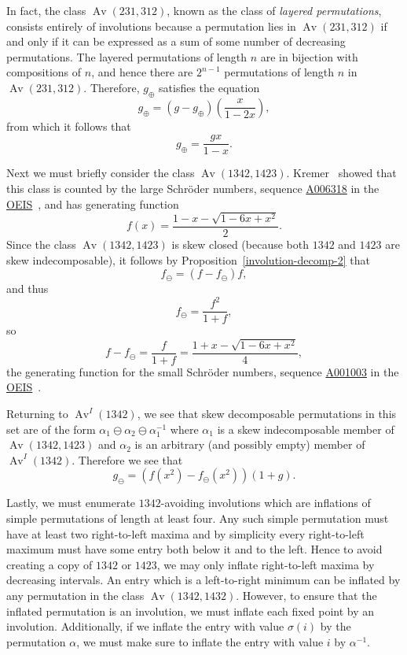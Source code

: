 \documentclass[10pt]{article}
\theoremstyle{plain}
\newcommand{\Av}{\operatorname{Av}}
\newcommand{\ds}{\displaystyle}
\newcommand{\pa}[1]{\left({#1}\right)}
\newcommand{\f}[2]{\ds\frac{{#1}}{{#2}}}
\newcommand{\OEISlink}[1]{\href{http://oeis.org/#1}{#1}}
\newcommand{\OEISref}{\href{http://oeis.org/}{OEIS}~\cite{sloane:the-on-line-enc:}}
\newcommand{\OEIS}[1]{sequence \OEISlink{#1} in the \OEISref}
\begin{document}
In fact, the class $\Av(231,312)$, known as the class of \emph{layered permutations}, consists entirely of involutions because a permutation lies in $\Av(231,312)$ if and only if it can be expressed as a sum of some number of decreasing permutations. The layered permutations of length $n$ are in bijection with compositions of $n$, and hence there are $2^{n-1}$ permutations of length $n$ in $\Av(231,312)$. Therefore, $g_\oplus$ satisfies the equation
	\[g_\oplus = \pa{g - g_\oplus}\pa{\f{x}{1-2x}},\]
from which it follows that
	\begin{equation}
	\label{eq-1342-1}
	g_\oplus = \f{gx}{1-x}.
	\end{equation}

Next we must briefly consider the class $\Av(1342,1423)$. Kremer~\cite{kremer:permutations-wi:, kremer:postscript:-per:} showed that this class is counted by the large Schr\"oder numbers, \OEIS{A006318}, and has generating function
	\[f(x) = \f{1-x-\sqrt{1-6x+x^2}}{2}.\]
Since the class $\Av(1342,1423)$ is skew closed (because both $1342$ and $1423$ are skew indecomposable), it follows by Proposition~\ref{involution-decomp-2} that
	\[f_\ominus = (f - f_\ominus)f,\]
and thus
	\[f_\ominus = \f{f^2}{1+f},\]
so
	\[f - f_\ominus = \f{f}{1+f} = \f{1+x-\sqrt{1-6x+x^2}}{4},\]
the generating function for the small Schr\"oder numbers, \OEIS{A001003}.

Returning to $\Av^I(1342)$, we see that skew decomposable permutations in this set are of the form $\alpha_1\ominus\alpha_2\ominus\alpha_1^{-1}$ where $\alpha_1$ is a skew indecomposable member of $\Av(1342,1423)$ and $\alpha_2$ is an arbitrary (and possibly empty) member of $\Av^I(1342)$. Therefore we see that
	\begin{equation}
	\label{eq-1342-2}
	g_\ominus = \pa{f(x^2)-f_\ominus(x^2)}(1+g).
	\end{equation}
	
Lastly, we must enumerate $1342$-avoiding involutions which are inflations of simple permutations of length at least four. Any such simple permutation must have at least two right-to-left maxima and by simplicity every right-to-left maximum must have some entry both below it and to the left. Hence to avoid creating a copy of $1342$ or $1423$, we may only inflate right-to-left maxima by decreasing intervals. An entry which is a left-to-right minimum can be inflated by any permutation in the class $\Av(1342,1432)$. However, to ensure that the inflated permutation is an involution, we must inflate each fixed point by an involution. Additionally, if we inflate the entry with value $\sigma(i)$ by the permutation $\alpha$, we must make sure to inflate the entry with value $i$ by $\alpha^{-1}$.
\end{document}
